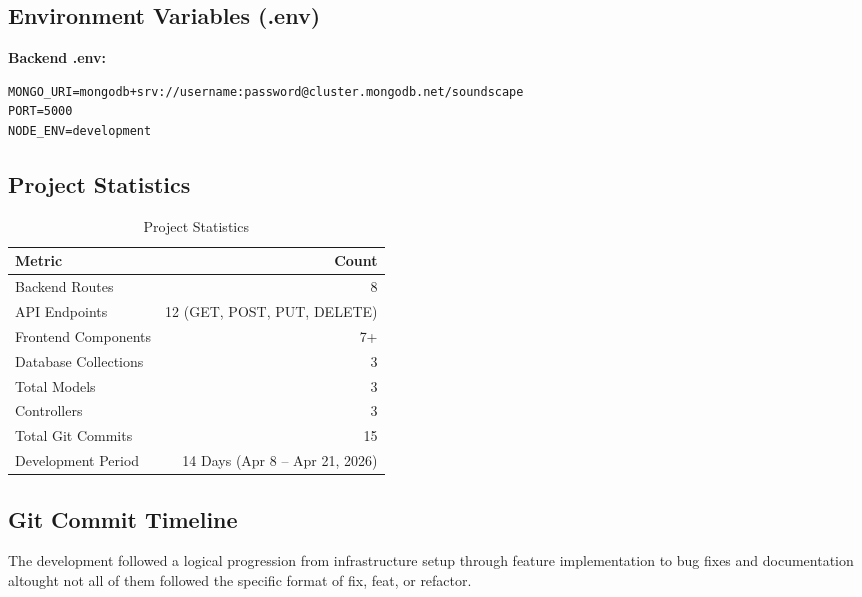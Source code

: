\documentclass[11pt,a4paper]{article}
\begin{document}
\subsection{Environment Variables (.env)}

\textbf{Backend .env:}
\begin{lstlisting}
MONGO_URI=mongodb+srv://username:password@cluster.mongodb.net/soundscape
PORT=5000
NODE_ENV=development
\end{lstlisting}

\subsection{Project Statistics}

\begin{table}[H]
\centering
\begin{tabular}{|l|r|}
\hline
\textbf{Metric} & \textbf{Count} \\
\hline
Backend Routes & 8 \\
API Endpoints & 12 (GET, POST, PUT, DELETE) \\
Frontend Components & 7+ \\
Database Collections & 3 \\
Total Models & 3 \\
Controllers & 3 \\
Total Git Commits & 15 \\
Development Period & 14 Days (Apr 8 -- Apr 21, 2026) \\
\hline
\end{tabular}
\caption{Project Statistics}
\end{table}

\subsection{Git Commit Timeline}

The development followed a logical progression from infrastructure setup through feature implementation to bug fixes and documentation altought not all of them followed the specific format of fix, feat, or refactor.
\end{document}
